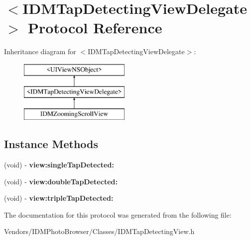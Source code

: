 \hypertarget{protocol_i_d_m_tap_detecting_view_delegate-p}{}\section{$<$I\+D\+M\+Tap\+Detecting\+View\+Delegate$>$ Protocol Reference}
\label{protocol_i_d_m_tap_detecting_view_delegate-p}
Inheritance diagram for $<$I\+D\+M\+Tap\+Detecting\+View\+Delegate$>$\+:\begin{figure}[H]
\begin{center}
\leavevmode
\includegraphics[height=3.000000cm]{protocol_i_d_m_tap_detecting_view_delegate-p}
\end{center}
\end{figure}
\subsection*{Instance Methods}
\begin{DoxyCompactItemize}
\item 
\hypertarget{protocol_i_d_m_tap_detecting_view_delegate-p_aca280ea18005d68776cabd71ec75e99f}{}(void) -\/ {\bfseries view\+:single\+Tap\+Detected\+:}\label{protocol_i_d_m_tap_detecting_view_delegate-p_aca280ea18005d68776cabd71ec75e99f}

\item 
\hypertarget{protocol_i_d_m_tap_detecting_view_delegate-p_a04540984be86cfd8812ebed325612bc2}{}(void) -\/ {\bfseries view\+:double\+Tap\+Detected\+:}\label{protocol_i_d_m_tap_detecting_view_delegate-p_a04540984be86cfd8812ebed325612bc2}

\item 
\hypertarget{protocol_i_d_m_tap_detecting_view_delegate-p_a0357d82167a6354329644b922dfe2291}{}(void) -\/ {\bfseries view\+:triple\+Tap\+Detected\+:}\label{protocol_i_d_m_tap_detecting_view_delegate-p_a0357d82167a6354329644b922dfe2291}

\end{DoxyCompactItemize}


The documentation for this protocol was generated from the following file\+:\begin{DoxyCompactItemize}
\item 
Vendors/\+I\+D\+M\+Photo\+Browser/\+Classes/I\+D\+M\+Tap\+Detecting\+View.\+h\end{DoxyCompactItemize}
